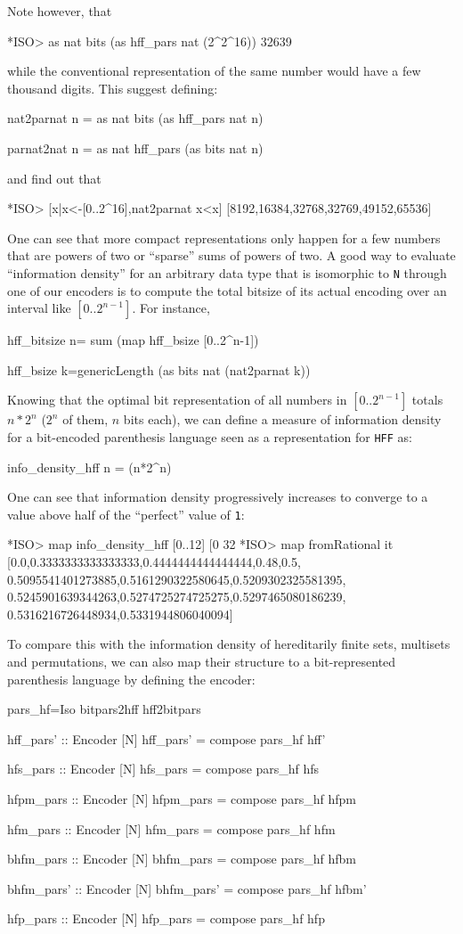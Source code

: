 \documentclass[]{INCLUDES/llncs}
\begin{document}
Note however, that
\begin{codex}
*ISO> as nat bits (as hff_pars nat (2^2^16))
32639
\end{codex}
while the conventional representation of the same number would
have a few thousand digits. This suggest defining:
\begin{code}
nat2parnat n = as nat bits (as hff_pars nat n)

parnat2nat n = as nat hff_pars (as bits nat n)
\end{code}
and find out that
\begin{codex}
*ISO> [x|x<-[0..2^16],nat2parnat x<x]
[8192,16384,32768,32769,49152,65536]
\end{codex}
One can see that more compact representations only happen
for a few numbers that are powers of two or ``sparse'' sums of
powers of two.
A good way to evaluate ``information density'' for an arbitrary
data type that is isomorphic to {\tt N} through one of our encoders
is to compute the total bitsize of its actual encoding over an
interval like $[0..2^{n-1}]$. For instance,
\begin{code}
hff_bitsize n= sum (map hff_bsize [0..2^n-1])

hff_bsize k=genericLength (as bits nat (nat2parnat k)) 
\end{code}
Knowing that the optimal bit representation of all numbers in $[0..2^{n-1}]$
totals $n*2^n$ ($2^n$ of them, $n$ bits each), we can define a measure of
information density for a bit-encoded parenthesis language seen as a
representation for {\tt HFF} as:
\begin{code}
info_density_hff n = (n*2^n)%
\end{code}
One can see that information density progressively increases to converge
to a value above half of the ``perfect'' value of {\tt 1}:
\begin{codex}
*ISO> map info_density_hff [0..12]
[0%
    32%
*ISO> map fromRational it
[0.0,0.3333333333333333,0.4444444444444444,0.48,0.5,
 0.5095541401273885,0.5161290322580645,0.5209302325581395,
 0.5245901639344263,0.5274725274725275,0.5297465080186239,
 0.5316216726448934,0.5331944806040094]    
\end{codex}
To compare this with the information density of hereditarily finite sets,
multisets and permutations, we can also map their structure to a bit-represented
parenthesis language by defining the encoder:
\begin{code}
pars_hf=Iso bitpars2hff hff2bitpars

hff_pars' :: Encoder [N]
hff_pars' = compose pars_hf hff'

hfs_pars :: Encoder [N]
hfs_pars = compose pars_hf hfs

hfpm_pars :: Encoder [N]
hfpm_pars = compose pars_hf hfpm

hfm_pars :: Encoder [N]
hfm_pars = compose pars_hf hfm

bhfm_pars :: Encoder [N]
bhfm_pars = compose pars_hf hfbm

bhfm_pars' :: Encoder [N]
bhfm_pars' = compose pars_hf hfbm'

hfp_pars :: Encoder [N]
hfp_pars = compose pars_hf hfp
\end{code}
\end{document}
